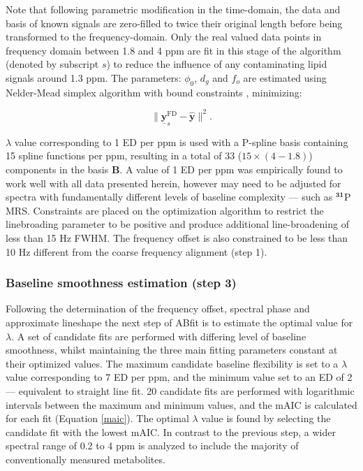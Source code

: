 \documentclass[num-refs]{wiley-article}
\begin{document}
Note that following parametric modification in the time-domain, the data and basis of known signals are zero-filled to twice their original length before being transformed to the frequency-domain. Only the real valued data points in frequency domain between 1.8 and 4 ppm are fit in this stage of the algorithm (denoted by subscript $s$) to reduce the influence of any contaminating lipid signals around 1.3 ppm. The parameters: $\phi_{0}$, $d_{g}$ and $f_{o}$ are estimated using Nelder-Mead simplex algorithm with bound constraints \cite{Box1965}, minimizing:

\begin{equation}
    \| \underline{\textbf{y}}^{\mathrm{FD}}_{s}  - \hat{\textbf{y}} \|^{2}.
  \label{obj_fn}
\end{equation}

 $\lambda$ value corresponding to 1 ED per ppm is used with a P-spline basis containing 15 spline functions per ppm, resulting in a total of 33 ($15 \times (4 - 1.8)$) components in the basis $\textbf{B}$. A value of 1 ED per ppm was empirically found to work well with all data presented herein, however may need to be adjusted for spectra with fundamentally different levels of baseline complexity --- such as $^{\textbf{31}}$P MRS. Constraints are placed on the optimization algorithm to restrict the linebroading parameter to be positive and produce additional line-broadening of less than 15 Hz FWHM. The frequency offset is also constrained to be less than 10 Hz different from the coarse frequency alignment (step 1).

\subsubsection{Baseline smoothness estimation (step 3)}
Following the determination of the frequency offset, spectral phase and approximate lineshape the next step of ABfit is to estimate the optimal value for $\lambda$. A set of candidate fits are performed with differing level of baseline smoothness, whilst maintaining the three main fitting parameters constant at their optimized values. The maximum candidate baseline flexibility is set to a $\lambda$ value corresponding to 7 ED per ppm, and the minimum value set to an ED of 2 --- equivalent to straight line fit. 20 candidate fits are performed with logarithmic intervals between the maximum and minimum values, and the mAIC is calculated for each fit (Equation \ref{maic}). The optimal $\lambda$ value is found by selecting the candidate fit with the lowest mAIC. In contrast to the previous step, a wider spectral range of 0.2 to 4 ppm is analyzed to include the majority of conventionally measured metabolites.
\end{document}
